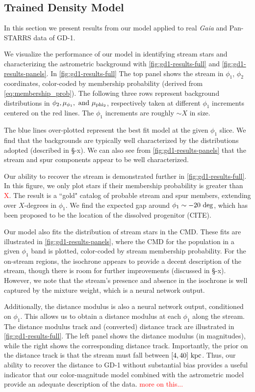 \documentclass[twocolumn]{aastex631}
\newcommand{\TODO}[1]{{\textcolor{red}{#1}}}
\newcommand{\JN}[1]{\TODO{#1}}
\begin{document}
        
    \subsection{Trained Density Model}\label{ssub:trained_gd1}
    
        In this section we present results from our model applied to real {\it Gaia} and Pan-STARRS data of GD-1. 

        We visualize the performance of our model in identifying stream stars and characterizing the astrometric background with \autoref{fig:gd1-results-full} and \autoref{fig:gd1-results-panels}. In \autoref{fig:gd1-results-full} The top panel shows the stream in $\phi_1$, $\phi_2$ coordinates, color-coded by membership probability (derived from \autoref{eq:membership_prob}). The following three rows represent background distributions in $\phi_2, \mu_{\phi_1}, \rm{\ and} \ \mu_{\rm phi_2}$, respectively taken at different $\phi_1$ increments centered on the red lines. The $\phi_1$ increments are roughly $\sim X$ in size. 

        The blue lines over-plotted represent the best fit model at the given $\phi_1$ slice. We find that the backgrounds are typically well characterized by the distributions adopted (described in \S-x). We can also see from \autoref{fig:gd1-results-panels}
        that the stream and spur components appear to be well characterized. 
        
        Our ability to recover the stream is demonstrated further in \autoref{fig:gd1-results-full}. In this figure, we only plot stars if their membership probability is greater than \JN{X}. The result is a ``gold" catalog of probable stream and spur members, extending over $X$-degrees in $\phi_1$. We find the expected gap around $\phi_1 \sim -20~\rm{deg}$, which has been proposed to be the location of the dissolved progenitor (CITE).

        Our model also fits the distribution of stream stars in the CMD. These fits are illustrated in \autoref{fig:gd1-results-panels}, where the CMD for the population in a given $\phi_1$ band is plotted, color-coded by stream membership probability. For the on-stream regions, the isochrone appears to provide a decent description of the stream, though there is room for further improvements (discussed in \S-x). However, we note that the stream's presence and absence in the isochrone is well captured by the mixture weight, which is a neural network output. 
        
        Additionally, the distance modulus is also a neural network output, conditioned on $\phi_1$. This allows us to obtain a distance modulus at each $\phi_1$ along the stream. The distance modulus track and (converted) distance track are illustrated in \autoref{fig:gd1-results-full}. The left panel shows the distance modulus (in magnitudes), while the right shows the corresponding distance track. Importantly, the prior on the distance track is that the stream must fall between $[4,40]~\rm{kpc}$. Thus, our ability to recover the distance to GD-1 without substantial bias provides a useful indicator that our color-magnitude model combined with the astrometric model provide an adequate description of the data. \JN{more on this...}
\end{document}
